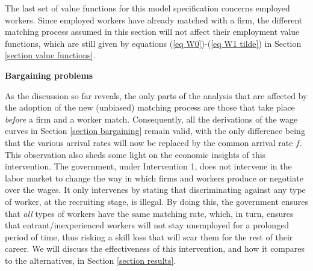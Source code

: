 \documentclass[12pt]{article} %
\theoremstyle{definition}
\begin{document}
The last set of value functions for this model specification concerns employed workers. Since employed workers have already matched with a firm, the different matching process assumed in this section will not affect their employment value functions, which are still given by equations (\ref{eq W0})-(\ref{eq W1 tilde}) in Section \ref{section value functions}. 

\bigskip 

\noindent \textbf{Bargaining problems}

\noindent As the discussion so far reveals, the only parts of the analysis that are affected by the adoption of the new (unbiased) matching process are those that take place    \textit{before} a firm and a worker match. Consequently, all the derivations of the wage curves in Section \ref{section bargaining} remain valid, with the only difference being that the various arrival rates will now be replaced by the common arrival rate $f$. This observation also sheds some light on the economic insights of this intervention. The government, under Intervention 1, does not intervene in the labor market to change the way in which firms and workers produce or negotiate over the wages. It only intervenes by stating that discriminating against any type of worker, at the recruiting stage, is illegal. By doing this, the government ensures that \textit{all} types of workers have the same matching rate, which, in turn, ensures that entrant/inexperienced workers will not stay unemployed for a prolonged period of time, thus risking a skill loss that will scar them for the rest of their career. We will discuss the effectiveness of this intervention, and how it compares to the alternatives, in Section \ref{section results}. 
\end{document}
